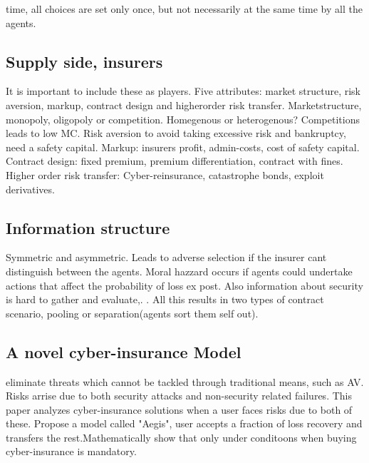 time, all choices are set only once, but not necessarily at the same time by all the agents. 
\subsection{Supply side, insurers}
It is important to include these as players. Five attributes: market structure, risk aversion, markup, contract design and higherorder risk transfer.
Marketstructure, monopoly, oligopoly or competition. Homegenous or heterogenous? Competitions leads to low MC. Risk aversion to avoid taking excessive risk and bankruptcy, need a safety capital. 
Markup: insurers profit, admin-costs, cost of safety capital. 
Contract design: fixed premium, premium differentiation, contract with fines.
Higher order risk transfer: 
Cyber-reinsurance, catastrophe bonds, exploit derivatives.
\subsection{Information structure}
Symmetric and asymmetric. Leads to adverse selection if the insurer cant distinguish
 between the agents. Moral hazzard occurs if agents could undertake actions that affect
  the probability of loss ex post. Also information about security is hard to gather and
   evaluate,. . All this results in two types of contract scenario, pooling or
    separation(agents sort them self out).
\subsection{A novel cyber-insurance Model}
eliminate threats which cannot be tackled through traditional means, such as AV. Risks arrise due to both security attacks and non-security related failures. This paper analyzes cyber-insurance solutions when a user faces risks due to both of these. Propose a model called "Aegis", user accepts a fraction of loss recovery and transfers the rest.Mathematically show that only under conditoons when buying cyber-insurance  is mandatory.
